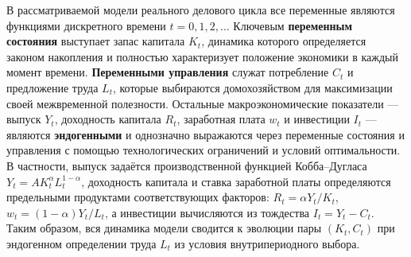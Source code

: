 В рассматриваемой модели реального делового цикла все переменные являются функциями дискретного времени $t = 0,1,2,\dots$ Ключевым \textbf{переменным состояния} выступает запас капитала $K_t$, динамика которого определяется законом накопления и полностью характеризует положение экономики в каждый момент времени. \textbf{Переменными управления} служат потребление $C_t$ и предложение труда $L_t$, которые выбираются домохозяйством для максимизации своей межвременной полезности. Остальные макроэкономические показатели — выпуск $Y_t$, доходность капитала $R_t$, заработная плата $w_t$ и инвестиции $I_t$ — являются \textbf{эндогенными} и однозначно выражаются через переменные состояния и управления с помощью технологических ограничений и условий оптимальности. В частности, выпуск задаётся производственной функцией Кобба–Дугласа $Y_t = A K_t^{\alpha} L_t^{1-\alpha}$, доходность капитала и ставка заработной платы определяются предельными продуктами соответствующих факторов: $R_t = \alpha Y_t/K_t$, $w_t = (1-\alpha)Y_t/L_t$, а инвестиции вычисляются из тождества $I_t = Y_t - C_t$. Таким образом, вся динамика модели сводится к эволюции пары $(K_t, C_t)$ при эндогенном определении труда $L_t$ из условия внутрипериодного выбора.




